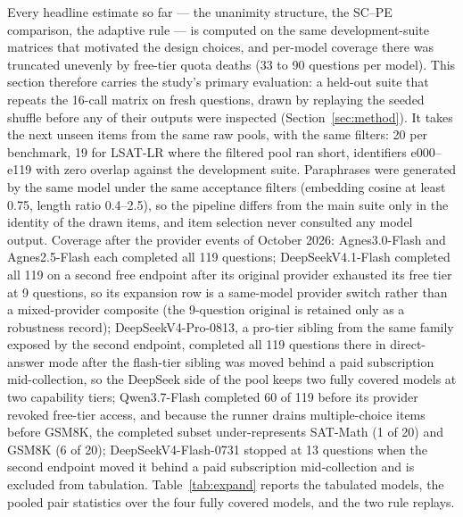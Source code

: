 Every headline estimate so far --- the unanimity structure, the SC--PE comparison, the adaptive rule --- is computed on the same development-suite matrices that motivated the design choices, and per-model coverage there was truncated unevenly by free-tier quota deaths (33 to 90 questions per model). This section therefore carries the study's primary evaluation: a held-out suite that repeats the 16-call matrix on fresh questions, drawn by replaying the seeded shuffle before any of their outputs were inspected (Section~\ref{sec:method}). It takes the next unseen items from the same raw pools, with the same filters: 20 per benchmark, 19 for LSAT-LR where the filtered pool ran short, identifiers e000--e119 with zero overlap against the development suite. Paraphrases were generated by the same model under the same acceptance filters (embedding cosine at least 0.75, length ratio 0.4--2.5), so the pipeline differs from the main suite only in the identity of the drawn items, and item selection never consulted any model output. Coverage after the provider events of October 2026: Agnes3.0-Flash and Agnes2.5-Flash each completed all 119 questions; DeepSeekV4.1-Flash completed all 119 on a second free endpoint after its original provider exhausted its free tier at 9 questions, so its expansion row is a same-model provider switch rather than a mixed-provider composite (the 9-question original is retained only as a robustness record); DeepSeekV4-Pro-0813, a pro-tier sibling from the same family exposed by the second endpoint, completed all 119 questions there in direct-answer mode after the flash-tier sibling was moved behind a paid subscription mid-collection, so the DeepSeek side of the pool keeps two fully covered models at two capability tiers; Qwen3.7-Flash completed 60 of 119 before its provider revoked free-tier access, and because the runner drains multiple-choice items before GSM8K, the completed subset under-represents SAT-Math (1 of 20) and GSM8K (6 of 20); DeepSeekV4-Flash-0731 stopped at 13 questions when the second endpoint moved it behind a paid subscription mid-collection and is excluded from tabulation. Table~\ref{tab:expand} reports the tabulated models, the pooled pair statistics over the four fully covered models, and the two rule replays.

\begin{table}[tbp]
\centering
\footnotesize
\caption{Expansion set (119 fresh questions, 16-call matrix). Accuracy (\%) of the fixed conditions, the unanimity rate, and the two rule replays. $\S$: Qwen3.7-Flash completed 60 of 119 questions on a subset that under-represents SAT-Math and GSM8K (Section~\ref{sec:expand}); its row is a partial replication, not a full one. Pooled aggregates the four fully covered models over 476 model--question pairs (questions weighted equally, each question contributing the mean over its four models).}
\label{tab:expand}

\end{table}

